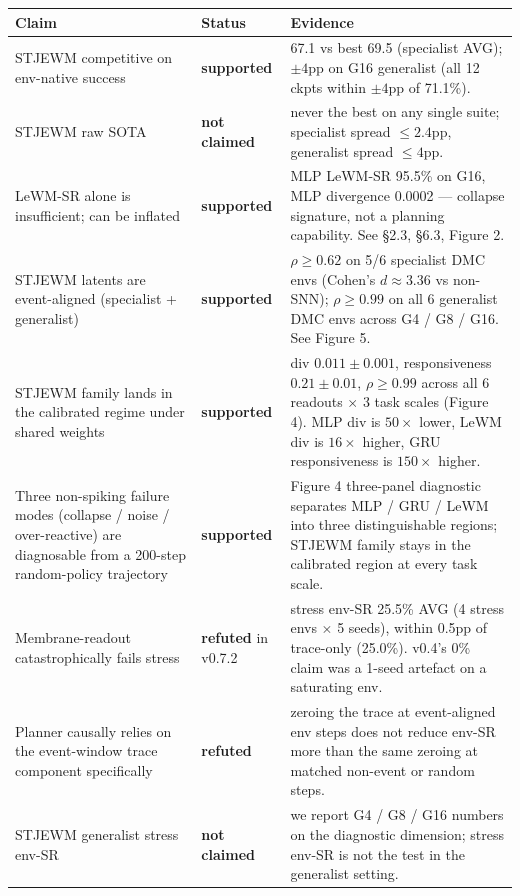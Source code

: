 \documentclass{article}
\begin{document}
\begin{table}[ht]
\centering
\small
\begin{tabular}{lp{3cm}p{8cm}}
\toprule
Claim & Status & Evidence \\
\midrule
STJEWM competitive on env-native success
  & \textbf{supported}
  & 67.1 vs best 69.5 (specialist AVG); $\pm 4$pp on G16 generalist (all 12 ckpts within $\pm 4$pp of 71.1\%).
  \\
STJEWM raw SOTA
  & \textbf{not claimed}
  & never the best on any single suite; specialist spread $\leq 2.4$pp, generalist spread $\leq 4$pp.
  \\
LeWM-SR alone is insufficient; can be inflated
  & \textbf{supported}
  & MLP LeWM-SR 95.5\% on G16, MLP divergence 0.0002 --- collapse signature, not a planning capability. See \S 2.3, \S 6.3, Figure 2.
  \\
STJEWM latents are event-aligned (specialist + generalist)
  & \textbf{supported}
  & $\rho \geq 0.62$ on 5/6 specialist DMC envs (Cohen's $d \approx 3.36$ vs non-SNN); $\rho \geq 0.99$ on all 6 generalist DMC envs across G4 / G8 / G16. See Figure 5.
  \\
STJEWM family lands in the calibrated regime under shared weights
  & \textbf{supported}
  & div $0.011 \pm 0.001$, responsiveness $0.21 \pm 0.01$, $\rho \geq 0.99$ across all 6 readouts $\times$ 3 task scales (Figure 4). MLP div is $50\times$ lower, LeWM div is $16\times$ higher, GRU responsiveness is $150\times$ higher.
  \\
Three non-spiking failure modes (collapse / noise / over-reactive) are diagnosable from a 200-step random-policy trajectory
  & \textbf{supported}
  & Figure 4 three-panel diagnostic separates MLP / GRU / LeWM into three distinguishable regions; STJEWM family stays in the calibrated region at every task scale.
  \\
Membrane-readout catastrophically fails stress
  & \textbf{refuted} in v0.7.2
  & stress env-SR 25.5\% AVG (4 stress envs $\times$ 5 seeds), within 0.5pp of trace-only (25.0\%). v0.4's 0\% claim was a 1-seed artefact on a saturating env.
  \\
Planner causally relies on the event-window trace component specifically
  & \textbf{refuted}
  & zeroing the trace at event-aligned env steps does not reduce env-SR more than the same zeroing at matched non-event or random steps.
  \\
STJEWM generalist stress env-SR
  & \textbf{not claimed}
  & we report G4 / G8 / G16 numbers on the diagnostic dimension; stress env-SR is not the test in the generalist setting.

\end{tabular}
\end{table}
\end{document}

